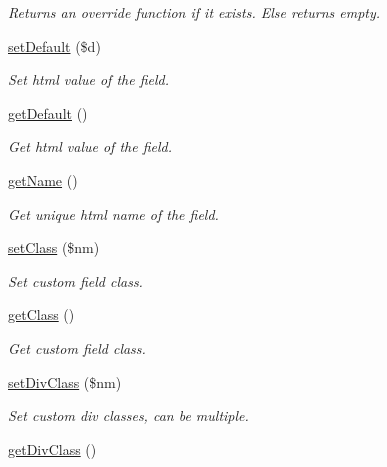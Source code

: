 \begin{DoxyCompactItemize}
\begin{DoxyCompactList}\small\item\em Returns an override function if it exists. Else returns empty. \end{DoxyCompactList}\item 
\hypertarget{class_fields_aaf2bb7deba74bb0f994044954bd74ff3}{\hyperlink{class_fields_aaf2bb7deba74bb0f994044954bd74ff3}{set\-Default} (\$d)}\label{class_fields_aaf2bb7deba74bb0f994044954bd74ff3}

\begin{DoxyCompactList}\small\item\em Set html value of the field. \end{DoxyCompactList}\item 
\hypertarget{class_fields_adc30a2a4d3e48cb6aee21562afbc4022}{\hyperlink{class_fields_adc30a2a4d3e48cb6aee21562afbc4022}{get\-Default} ()}\label{class_fields_adc30a2a4d3e48cb6aee21562afbc4022}

\begin{DoxyCompactList}\small\item\em Get html value of the field. \end{DoxyCompactList}\item 
\hypertarget{class_fields_a3d0963e68bb313b163a73f2803c64600}{\hyperlink{class_fields_a3d0963e68bb313b163a73f2803c64600}{get\-Name} ()}\label{class_fields_a3d0963e68bb313b163a73f2803c64600}

\begin{DoxyCompactList}\small\item\em Get unique html name of the field. \end{DoxyCompactList}\item 
\hyperlink{class_fields_a6f75ffe7d98c9e375394d63f8d379b2d}{set\-Class} (\$nm)
\begin{DoxyCompactList}\small\item\em Set custom field class. \end{DoxyCompactList}\item 
\hyperlink{class_fields_a23ecbde357f7f6bde5a50f876334a74d}{get\-Class} ()
\begin{DoxyCompactList}\small\item\em Get custom field class. \end{DoxyCompactList}\item 
\hyperlink{class_fields_a4e25c00802ca9e9afb52a9177014fea7}{set\-Div\-Class} (\$nm)
\begin{DoxyCompactList}\small\item\em Set custom div classes, can be multiple. \end{DoxyCompactList}\item 
\hypertarget{class_fields_aeb623d3ef75a148185d6e14f7369f452}{\hyperlink{class_fields_aeb623d3ef75a148185d6e14f7369f452}{get\-Div\-Class} ()}\label{class_fields_aeb623d3ef75a148185d6e14f7369f452}


\end{DoxyCompactItemize}
